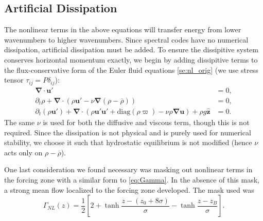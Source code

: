 \documentclass[
        fleqn,
        usenatbib,
    ]{mnras}
\newcommand*{\s}[1]{\left[#1\right]}
\newcommand*{\bm}[1]{\boldsymbol{\mathbf{#1}}}
\newcommand*{\uv}[1]{\hat{\boldsymbol{\mathbf{#1}}}}
\begin{document}
\subsection{Artificial Dissipation}

The nonlinear terms in the above equations will transfer energy from lower
wavenumbers to higher wavenumbers. Since spectral codes have no numerical
dissipation, artificial dissipation must be added. To ensure the dissipitive
system conserves horizontal momentum exactly, we begin by adding dissipitive
terms to the flux-conservative form of the Euler fluid equations
\autoref{se:nl_orig} (we use stress tensor $\tau_{ij} = P\delta_{ij}$):
\begin{subequations}
    \begin{align}
        \bm{\nabla} \cdot \bm{u}' &= 0,\\
        \partial_t \rho + \bm{\nabla} \cdot (\rho \bm{u}' - \nu
            \bm{\nabla}(\rho - \overline{\rho})) &= 0,\label{eq:visc_cons_mom}\\
        \partial_t (\rho \bm{u}') + \bm{\nabla} \cdot (\rho \bm{u}' \bm{u}'
            + \mathrm{diag}(\rho \varpi)
            - \nu \rho \bm{\nabla}\bm{u})
            + \rho g \uv{z} &= 0.
    \end{align}
\end{subequations}
The same $\nu$ is used for both the diffusive and viscous term, though this is
not required. Since the dissipation is not physical and is purely used for
numerical stability, we choose it such that hydrostatic equilibrium is not
modified (hence $\nu$ acts only on $\rho - \overline{\rho}$).

One last consideration we found necessary was masking out nonlinear terms in the
forcing zone with a similar form to \autoref{eq:Gamma}. In the absence of this
mask, a strong mean flow localized to the forcing zone developed. The mask used
was
\begin{equation}
    \Gamma_{NL}(z) = \frac{1}{2}\s{2
        + \tanh \frac{z - (z_0 + 8\sigma)}{\sigma}
        - \tanh \frac{z - z_B}{\sigma}}.
\end{equation}
\end{document}
